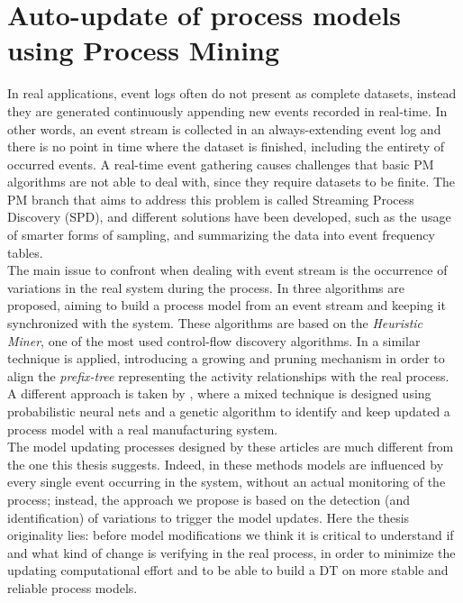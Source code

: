 \section{Auto-update of process models using Process Mining}
\label{Auto-update of process models using Process Mining}
In real applications, event logs often do not present as complete datasets, instead they are generated continuously appending new events recorded in real-time. In other words, an event stream is collected in an always-extending event log and there is no point in time where the dataset is finished, including the entirety of occurred events. A real-time event gathering causes challenges that basic PM algorithms are not able to deal with, since they require datasets to be finite. The PM branch that aims to address this problem is called Streaming Process Discovery (SPD), and different solutions have been developed, such as the usage of smarter forms of sampling, and summarizing the data into event frequency tables. \\
The main issue to confront when dealing with event stream is the occurrence of variations in the real system during the process. In \cite{6900341} three algorithms are proposed, aiming to build a process model from an event stream and keeping it synchronized with the system. These algorithms are based on the \textit{Heuristic Miner}, one of the most used control-flow discovery algorithms. In \cite{7376771} a similar technique is applied, introducing a growing and pruning mechanism in order to align the \textit{prefix-tree} representing the activity relationships with the real process. A different approach is taken by \cite{DennoPeterandDickersonCharlesandHardingJennifer}, where a mixed technique is designed using probabilistic neural nets and a genetic algorithm to identify and keep updated a process model with a real manufacturing system. \\
The model updating processes designed by these articles are much different from the one this thesis suggests. Indeed, in these methods models are influenced by every single event occurring in the system, without an actual monitoring of the process; instead, the approach we propose is based on the detection (and identification) of variations to trigger the model updates. Here the thesis originality lies: before model modifications we think it is critical to understand if and what kind of change is verifying in the real process, in order to minimize the updating computational effort and to be able to build a DT on more stable and reliable process models.
